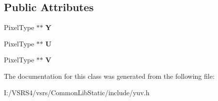 \subsection*{Public Attributes}
\begin{DoxyCompactItemize}
\item 
\mbox{\label{class_c_i_yuv_a9bc79ae28945e3bf0e940cb94f609053}} 
Pixel\+Type $\ast$$\ast$ {\bfseries Y}
\item 
\mbox{\label{class_c_i_yuv_a20d5f424700df3fa0d9041de7486461b}} 
Pixel\+Type $\ast$$\ast$ {\bfseries U}
\item 
\mbox{\label{class_c_i_yuv_a4c872e2132ff69175739754506f1e06d}} 
Pixel\+Type $\ast$$\ast$ {\bfseries V}
\end{DoxyCompactItemize}


The documentation for this class was generated from the following file\+:\begin{DoxyCompactItemize}
\item 
I\+:/\+V\+S\+R\+S4/vsrs/\+Common\+Lib\+Static/include/yuv.\+h\end{DoxyCompactItemize}
